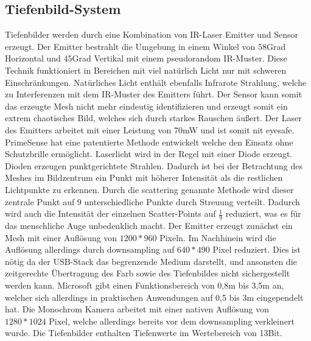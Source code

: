 		\subsection{Tiefenbild-System}
		Tiefenbilder werden durch eine Kombination von IR-Laser Emitter und Sensor erzeugt. Der Emitter bestrahlt die Umgebung in einem Winkel von $58$Grad Horizontal und $45$Grad Vertikal mit einem pseudorandom IR-Muster. Diese Technik funktioniert in Bereichen mit viel natürlich Licht nur mit schweren Einschränkungen. Natürliches Licht enthält ebenfalls Infrarote Strahlung, welche zu Interferenzen mit dem IR-Muster des Emitters führt. Der Sensor kann somit das erzeugte Mesh nicht mehr eindeutig identifizieren und erzeugt somit ein extrem chaotisches Bild, welches sich durch starkes Rauschen äußert. Der Laser des Emitters arbeitet mit einer Leistung von 70mW und ist somit nit eyesafe. PrimeSense hat eine patentierte Methode entwickelt welche den Einsatz ohne Schutzbrille ermöglicht. Laserlicht wird in der Regel mit einer Diode erzeugt. Dioden erzeugen punktgerichtete Strahlen. Dadurch ist bei der Betrachtung des Meshes im Bildzentrum ein Punkt mit höherer Intensität als die restlichen Lichtpunkte zu erkennen. Durch die scattering genannte Methode wird dieser zentrale Punkt auf 9 unterschiedliche Punkte durch Streuung verteilt. Dadurch wird auch die Intensität der einzelnen Scatter-Points auf $\frac{1}{9}$ reduziert, was es für das menschliche Auge unbedenklich macht. Der Emitter erzeugt zunächst ein Mesh mit einer Auflösung von $1200*960$ Pixeln. Im Nachhinein wird die Auflösung allerdings durch downsampling auf $640*490$ Pixel reduziert. Dies ist nötig da der USB-Stack das begrenzende Medium darstellt, und ansonsten die zeitgerechte Übertragung des Farb sowie des Tiefenbildes nicht sichergestellt werden kann. Microsoft gibt einen Funktionsbereich von 0,8m bis 3,5m an, welcher sich allerdings in praktischen Anwendungen auf 0,5 bis 3m eingependelt hat. Die Monochrom Kamera arbeitet mit einer nativen Auflösung von $1280*1024$ Pixel, welche allerdings bereits vor dem downsampling verkleinert wurde. Die Tiefenbilder enthalten Tiefenwerte im Wertebereich von 13Bit.
